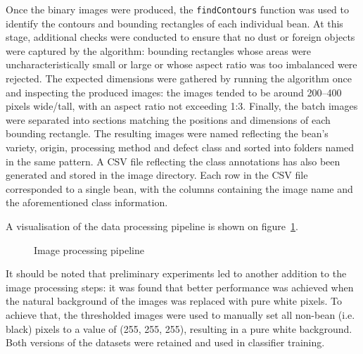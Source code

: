 Once the binary images were produced, the \verb |findContours| function was used to identify the contours and
bounding rectangles of each individual bean.
At this stage, additional checks were conducted to ensure that no dust or foreign objects were captured by the algorithm:
bounding rectangles whose areas were uncharacteristically small or large or whose aspect ratio was too imbalanced were rejected.
The expected dimensions were gathered by running the algorithm once and inspecting the produced images: the images tended
to be around 200--400 pixels wide/tall, with an aspect ratio not exceeding 1:3.
Finally, the batch images were separated into sections matching the positions and dimensions of each bounding rectangle.
The resulting images were named reflecting the bean's variety, origin, processing method and defect class and sorted into folders
named in the same pattern.
A CSV file reflecting the class annotations has also been generated and stored in the image directory.
Each row in the CSV file corresponded to a single bean, with the columns containing the image name and the
aforementioned class information.

A visualisation of the data processing pipeline is shown on figure~\ref{fig:imgProcessing}.

\begin{figure}[h]
    \centering
    \caption{Image processing pipeline}
    \label{fig:imgProcessing}
\end{figure}

It should be noted that preliminary experiments led to another addition to the image processing steps:
it was found that better performance was achieved when the natural background of the images was replaced with pure white pixels.
To achieve that, the thresholded images were used to manually set all non-bean (i.e. black) pixels to a value of (255, 255, 255),
resulting in a pure white background.
Both versions of the datasets were retained and used in classifier training.

